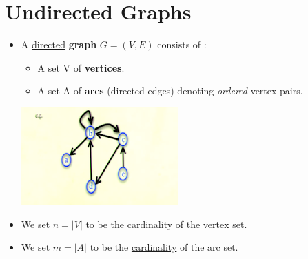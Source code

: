 \documentclass[12pt]{article}
\begin{document}
\section{Undirected Graphs}
\renewcommand{\labelitemii}{$\circ$}
\renewcommand{\labelitemiii}{$\cdot$}
\renewcommand{\labelitemiii}{$\rightarrow$}
\renewcommand{\labelitemiv}{$\star$}
\begin{itemize}
\item A \underline{directed} \textbf{graph} $G = (V, E)$ consists of :
	\begin{itemize}
	\item A set V of \textbf{vertices}.
	\item A set A of  \textbf{arcs} (directed edges) denoting \textit{ordered} vertex pairs.
	\end{itemize}
\begin{center}
\includegraphics{lecture72}
\end{center}
\item We set $n = |V|$ to be the \underline{cardinality} of the vertex set.
\item We set $m = |A|$ to be the \underline{cardinality} of the arc set.
\end{itemize}
\end{document}

